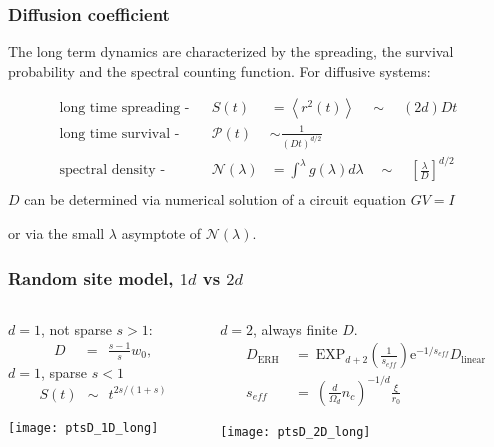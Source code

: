 \documentclass{beamer}
\newcommand{\eexp}{\mbox{e}^}
\begin{document}
\begin{frame}
    \frametitle{Diffusion coefficient}
    The long term dynamics are characterized by the spreading, the survival 
    probability and the spectral counting function. For diffusive systems:
    \vspace{16pt}

    \begin{align*}
        \text{long time spreading -} & &S(t) &= \left\langle r^2(t)\right\rangle \quad\sim\quad  (2d)Dt\ \\
        \text{long time survival -} & &\mathcal{P}(t) &\sim  \frac{1}{\left({D t}\right)^{d/2}}        \\
        \text{spectral density -} & &\mathcal{N}(\lambda)  &= \int^\lambda g(\lambda)d\lambda  \quad\sim\quad \left[\frac{\lambda}{D}\right]^{d/2} \\
    \end{align*}
$D$ can be determined via  numerical solution of a circuit equation $GV=I$

or via the small $\lambda$ asymptote of $\mathcal{N}(\lambda)$.
\end{frame}
\begin{frame}
\frametitle{Random site model, $1d$ vs $2d$}
\begin{columns}
\begin{column}{0.45\textwidth}
$d=1$, not sparse $s>1$:
\begin{align*}
D \ \ &=\ \  \frac{s -1 }{s} w_0, 
\end{align*}
$d=1$, sparse $s<1$  
%
\newline
\vspace{-15pt}
{\begin{align*}S(t) \ \ \sim \ \ t^{2s/(1+s)}\end{align*}
}
\vspace{-20pt}
%
\begin{center}
\texttt{[image: ptsD\_1D\_long]}
\end{center}
\end{column}
\vrule{}
\begin{column}{0.55\textwidth}
$d=2$, always finite $D$.
\newline
%
\begin{align*}
D_{\textrm{ERH}} \ &= \ \textrm{EXP}_{d+2} \left( \frac{1}{s_{\textit{eff}}} \right)\eexp{-1/s_{\textit{eff}}} D_{\textrm{linear}}\\
s_{\textit{eff}} \ &= \ \left(\frac{d}{\Omega_d}n_c \right)^{-1/d} \frac{\xi}{r_0}
\end{align*}
\begin{center}\texttt{[image: ptsD\_2D\_long]}\end{center}
\end{column}
\end{columns}

\end{frame}
\end{document}
